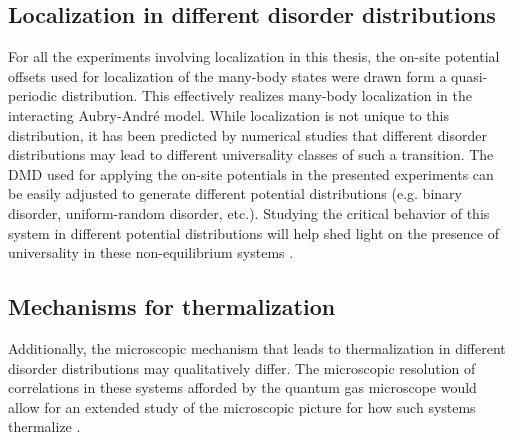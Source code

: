 \subsection{Localization in different disorder distributions}

For all the experiments involving localization in this thesis, the on-site potential offsets used for localization of the many-body states were drawn form a quasi-periodic distribution. This effectively realizes many-body localization in the interacting Aubry-Andr\'e model. While localization is not unique to this distribution, it has been predicted by numerical studies that different disorder distributions may lead to different universality classes of such a transition\cite{Khemani2017a,Zhang2018}. The DMD used for applying the on-site potentials in the presented experiments can be easily adjusted to generate different potential distributions (e.g. binary disorder, uniform-random disorder, etc.). Studying the critical behavior of this system in different potential distributions will help shed light on the presence of universality in these non-equilibrium systems \cite{Khemani2017a,Zhang2018,Setiawan2017}.


\subsection{Mechanisms for thermalization}

Additionally, the microscopic mechanism that leads to thermalization in different disorder distributions may qualitatively differ. The microscopic resolution of correlations in these systems afforded by the quantum gas microscope would allow for an extended study of the microscopic picture for how such systems thermalize \cite{Potter2015,Vosk2015,Zhang2018,Roeck2017,Luitz2017,Ponte2017}. 

